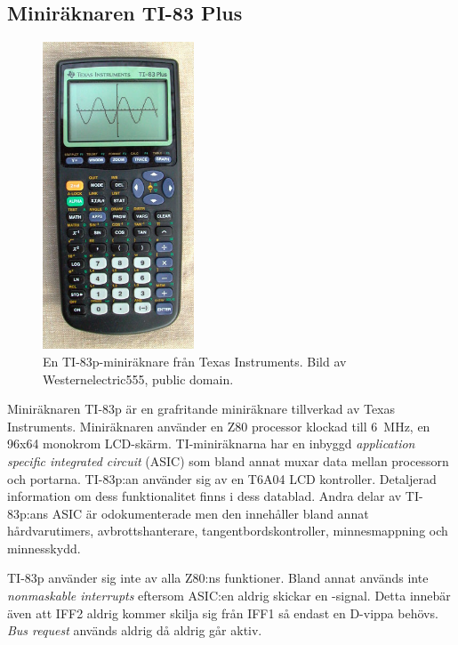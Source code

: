 \documentclass[main.tex]{subfiles}
\begin{document}
\newpage
\subsection{Miniräknaren TI-83 Plus}

\begin{figure}
    \centering
    \includegraphics[width=0.4\textwidth, bb=0 0 284 578]{img/ti83p.jpg}
    \caption{En TI-83p-miniräknare från Texas Instruments. Bild av
    Westernelectric555, public domain.}
    \label{fig:ti83p}
\end{figure}

Miniräknaren TI-83p är en grafritande miniräknare tillverkad av Texas
Instruments. Miniräknaren använder en Z80 processor klockad till
\SI{6}{\mega\hertz}, en 96x64 monokrom LCD-skärm. TI-miniräknarna har en
inbyggd {\it application specific integrated circuit} (ASIC) som bland annat
muxar data mellan processorn och portarna. TI-83p:an använder sig av en T6A04
LCD kontroller. Detaljerad information om dess funktionalitet finns i dess
datablad\cite{t6a04}. Andra delar av TI-83p:ans ASIC är odokumenterade men den
innehåller bland annat hårdvarutimers, avbrottshanterare,
tangentbordskontroller, minnesmappning och minnesskydd.

TI-83p använder sig inte av alla Z80:ns funktioner. Bland annat används inte
{\it nonmaskable interrupts} eftersom ASIC:en aldrig skickar en
-signal. Detta innebär även att IFF2 aldrig kommer skilja sig från
IFF1 så endast en D-vippa behövs. {\it Bus request} används aldrig då
 aldrig går aktiv.
\end{document}
